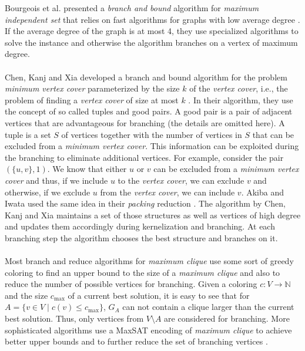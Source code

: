 \documentclass[]{article}
\begin{document}
Bourgeois et al. presented a \textit{branch and bound} algorithm for \textit{maximum independent set} that relies on fast algorithms for graphs with low average degree \cite{bourg}. If the average degree of the graph is at most 4, they use specialized algorithms to solve the instance and otherwise the algorithm branches on a vertex of maximum degree.\\\\
Chen, Kanj and Xia developed a branch and bound algorithm for the problem \textit{minimum vertex cover} parameterized by the size $k$ of the \textit{vertex cover}, i.e., the problem of finding a \textit{vertex cover} of size at most $k$ \cite{chen_xia}. In their algorithm, they use the concept of so called tuples and good pairs. A good pair is a pair of adjacent vertices that are advantageous for branching (the details are omitted here). A tuple is a set $S$ of vertices together with the number of vertices in $S$ that can be excluded from a \textit{minimum vertex cover}. This information can be exploited during the branching to eliminate additional vertices. For example, consider the pair $(\{u,v\}, 1)$. We know that either $u$ or $v$ can be excluded from a \textit{minimum vertex cover} and thus, if we include $u$ to the \textit{vertex cover}, we can exclude $v$ and otherwise, if we exclude $u$ from the \textit{vertex cover}, we can include $v$. Akiba and Iwata used the same idea in their \textit{packing} reduction \cite{akiba_iwata}. The algorithm by Chen, Kanj and Xia maintains a set of those structures as well as vertices of high degree and updates them accordingly during kernelization and branching. At each branching step the algorithm chooses the best structure and branches on it.\\\\
Most branch and reduce algorithms for \textit{maximum clique} use some sort of greedy coloring to find an upper bound to the size of a \textit{maximum clique} and also to reduce the number of possible vertices for branching. Given a coloring $c:V \rightarrow \mathbb{N}$ and the size $c_\text{max}$ of a current best solution, it is easy to see that for $A = \{v\in V \;|\; c(v)\leq c_\text{max}\}$, $G_A$ can not contain a clique larger than the current best solution. Thus, only vertices from $V\setminus A$ are considered for branching. More sophisticated algorithms use a MaxSAT encoding of \textit{maximum clique} to achieve better upper bounds and to further reduce the set of branching vertices \cite{li_jiang,li_fang_xu}. \\\\
\end{document}
